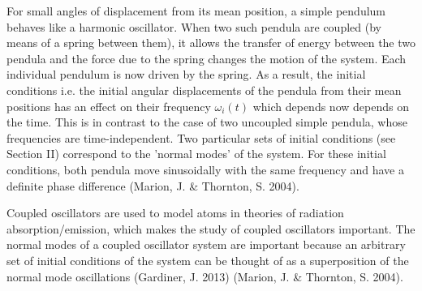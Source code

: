 \documentclass[main.tex]{subfiles}
\begin{document}
For small angles of displacement from its mean position, a simple pendulum behaves like a harmonic oscillator. When two such pendula are coupled (by means of a spring between them), it allows the transfer of energy between the two pendula and the force due to the spring changes the motion of the system. Each individual pendulum is now driven by the spring. As a result, the initial conditions i.e. the initial angular displacements of the pendula from their mean positions has an effect on their frequency $\omega_i (t)$ which depends now depends on the time. This is in contrast to the case of two uncoupled simple pendula, whose frequencies are time-independent. Two particular sets of initial conditions (see Section II) correspond to the 'normal modes' of the system. For these initial conditions, both pendula move sinusoidally with the same frequency and have a definite phase difference (Marion, J. & Thornton, S. 2004).


Coupled oscillators are used to model atoms in theories of radiation absorption/emission, which makes the study of coupled oscillators important. The normal modes of a coupled oscillator system are important because an arbitrary set of initial conditions of the system can be thought of as a superposition of the normal mode oscillations (Gardiner, J. 2013) (Marion, J. \& Thornton, S. 2004).
\end{document}
